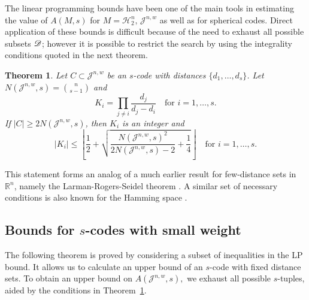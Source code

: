 \documentclass{amsart}
\newtheorem{theoremenv}[definitionenv]{Theorem}
\newenvironment{theorem}{\begin{theoremenv}\rm}{\end{theoremenv}}
\newcommand{\cH}{\mathcal{H}}
\newcommand{\cJ}{\mathcal{J}}
\newcommand{\reals}{{\mathbb {R}}}
\begin{document}
The {linear programming bounds} have been one of the main tools in estimating the value of $A(M,s)$ for $M=\cH_{2}^{n},\, \cJ^{n,w}$ as well as for spherical codes. Direct application of these bounds is difficult because of the need to exhaust
all possible subsets $\mathscr{D}$; however it is possible to restrict the search by using the integrality
conditions quoted in the next theorem.

\begin{theorem}{\cite{MN11}} \label{thm:LRS_J}
Let $C \subset \cJ^{n, w}$ be an $s$-code with distances $\{d_{1}, \dots, d_{s}\}$. Let $N(\cJ^{n, w}, s) = \binom{n}{s-1}$ and 
\begin{equation*}
    K_{i} = \prod_{j \neq i} \frac{d_{j}}{d_{j}-d_{i}}\quad\text{for $i=1, \dots, s$.}
\end{equation*}
 If $|C|\geq 2N(\cJ^{n, w}, s)$, then
$K_{i}$ is an integer and 
\begin{equation*}
|K_{i}| \leq \left\lfloor \frac{1}{2} + \sqrt{\frac{N(\cJ^{n, w}, s)^{2}}{2N(\cJ^{n, w}, s)-2}+\frac{1}{4}} \right\rfloor \quad\text{for $i=1, \dots, s$.}
\end{equation*}
\end{theorem}

This statement forms an analog of a much earlier result for few-distance sets in $\reals^n$, namely the Larman-Rogers-Seidel theorem
\cite{LRS77}. A similar set of necessary conditions is also known for the Hamming space \cite{MN11}.

\subsection{Bounds for \texorpdfstring{$s$}--codes with small weight}
The following theorem is proved by considering a subset of inequalities in the LP bound. It allows us to calculate an upper bound of an $s$-code with fixed distance sets. To obtain an upper bound on $A(\cJ^{n, w}, s),$ we exhaust all possible $s$-tuples, aided by the conditions in Theorem~\ref{thm:LRS_J}.
\end{document}

